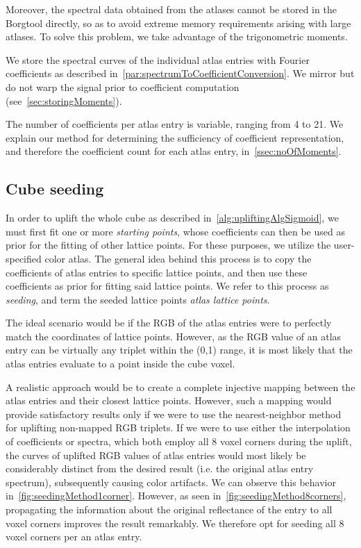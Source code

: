 Moreover, the spectral data obtained from the atlases cannot be stored in the Borgtool directly, so as to avoid extreme memory requirements arising with large atlases. To solve this problem, we take advantage of the trigonometric moments.

We store the spectral curves of the individual atlas entries with Fourier coefficients as described in~\cref{par:spectrumToCoefficientConversion}. We mirror but do not warp the signal prior to coefficient computation (see~\cref{sec:storingMoments}).

The number of coefficients per atlas entry is variable, ranging from 4 to 21. We explain our method for determining the sufficiency of coefficient representation, and therefore the coefficient count for each atlas entry, in~\cref{ssec:noOfMoments}.

\subsection{Cube seeding} 

In order to uplift the whole cube as described in~\cref{alg:upliftingAlgSigmoid}, we must first fit one or more \emph{starting points}, whose coefficients can then be used as prior for the fitting of other lattice points. For these purposes, we utilize the user-specified color atlas. The general idea behind this process is to copy the coefficients of atlas entries to specific lattice points, and then use these coefficients as prior for fitting said lattice points. We refer to this process as \emph{seeding}, and term the seeded lattice points \emph{atlas lattice points}.

The ideal scenario would be if the RGB of the atlas entries were to perfectly match the coordinates of lattice points. However, as the RGB value of an atlas entry can be virtually any triplet within the (0,1) range, it is most likely that the atlas entries evaluate to a point inside the cube voxel.

A realistic approach would be to create a complete injective mapping between the atlas entries and their closest lattice points. However, such a mapping would provide satisfactory results only if we were to use the nearest-neighbor method for uplifting non-mapped RGB triplets. If we were to use either the interpolation of coefficients or spectra, which both employ all 8 voxel corners during the uplift, the curves of uplifted RGB values of atlas entries would most likely be considerably distinct from the desired result (i.e. the original atlas entry spectrum), subsequently causing color artifacts. We can observe this behavior in~\cref{fig:seedingMethod1corner}. However, as seen in~\cref{fig:seedingMethod8corners}, propagating the information about the original reflectance of the entry to all voxel corners improves the result remarkably. We therefore opt for seeding all 8 voxel corners per an atlas entry.

